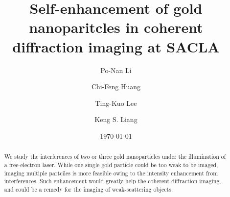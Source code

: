 \documentclass[aps,prb,reprint,groupedaddress, superscriptaddress]{revtex4-1}
\begin{document}

\title{Self-enhancement of gold nanoparitcles in coherent diffraction imaging at SACLA}



\author{Po-Nan Li}
\author{Chi-Feng Huang}
\author{Ting-Kuo Lee}
\author{Keng S. Liang}
	


\date{\today}

\begin{abstract}
We study the interferences of two or three gold nanoparticles under the illumination of a free-electron laser. 
While one single gold particle could be too weak to be imaged, imaging multiple partciles is more feasible owing to the intensity enhancement from interferences. 
Such enhancement would greatly help the coherent diffraction imaging, and could be a remedy for the imaging of weak-scattering objects.
\end{abstract}
\end{document}
